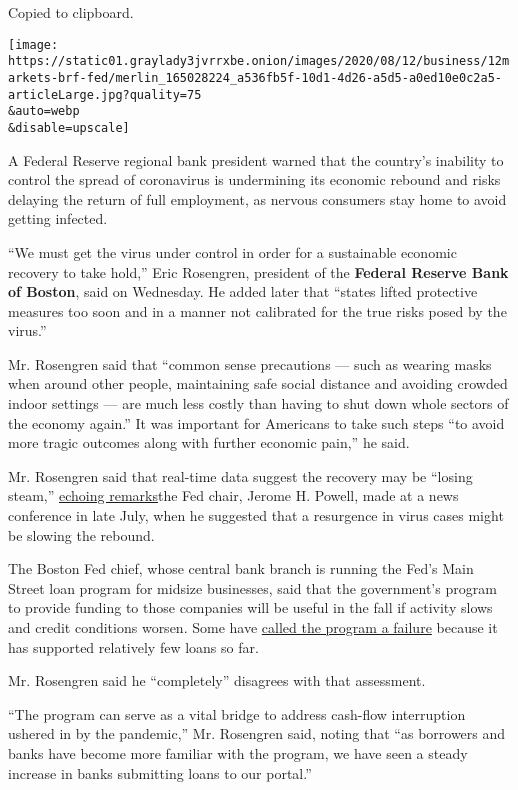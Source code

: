 Copied to clipboard.

\texttt{[image: https://static01.graylady3jvrrxbe.onion/images/2020/08/12/business/12markets-brf-fed/merlin\_165028224\_a536fb5f-10d1-4d26-a5d5-a0ed10e0c2a5-articleLarge.jpg?quality=75\\\&auto=webp\\\&disable=upscale]}

A Federal Reserve regional bank president warned that the country's
inability to control the spread of coronavirus is undermining its
economic rebound and risks delaying the return of full employment, as
nervous consumers stay home to avoid getting infected.

``We must get the virus under control in order for a sustainable
economic recovery to take hold,'' Eric Rosengren, president of the
\textbf{Federal Reserve Bank of Boston}, said on Wednesday. He added
later that ``states lifted protective measures too soon and in a manner
not calibrated for the true risks posed by the virus.''

Mr. Rosengren said that ``common sense precautions --- such as wearing
masks when around other people, maintaining safe social distance and
avoiding crowded indoor settings --- are much less costly than having to
shut down whole sectors of the economy again.'' It was important for
Americans to take such steps ``to avoid more tragic outcomes along with
further economic pain,'' he said.

Mr. Rosengren said that real-time data suggest the recovery may be
``losing steam,''
\href{https://www.rev.com/blog/transcripts/jerome-powell-fed-press-conference-speech-transcript-july-29}{echoing
remarks}the Fed chair, Jerome H. Powell, made at a news conference in
late July, when he suggested that a resurgence in virus cases might be
slowing the rebound.

The Boston Fed chief, whose central bank branch is running the Fed's
Main Street loan program for midsize businesses, said that the
government's program to provide funding to those companies will be
useful in the fall if activity slows and credit conditions worsen. Some
have
\href{https://www.nytimes3xbfgragh.onion/2020/08/07/business/economy/federal-reserve-main-street-lending.html}{called
the program a failure} because it has supported relatively few loans so
far.

Mr. Rosengren said he ``completely'' disagrees with that assessment.

``The program can serve as a vital bridge to address cash-flow
interruption ushered in by the pandemic,'' Mr. Rosengren said, noting
that ``as borrowers and banks have become more familiar with the
program, we have seen a steady increase in banks submitting loans to our
portal.''

